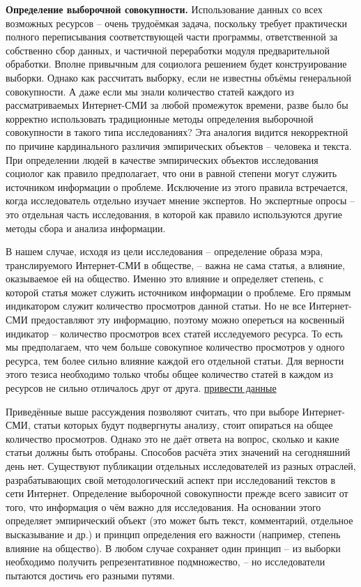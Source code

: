 \textbf{Определение выборочной совокупности.} Использование данных со всех возможных ресурсов -- очень трудоёмкая задача, поскольку требует практически полного переписывания соответствующей части программы, ответственной за собственно сбор данных, и частичной переработки модуля предварительной обработки. Вполне привычным для социолога решением будет конструирование выборки. Однако как рассчитать выборку, если не известны объёмы генеральной совокупности. А даже если мы знали количество статей каждого из рассматриваемых Интернет-СМИ за любой промежуток времени, разве было бы корректно использовать традиционные методы определения выборочной совокупности в такого типа исследованиях? Эта аналогия видится некорректной по причине кардинального различия эмпирических объектов -- человека и текста. При определении людей в качестве эмпирических объектов исследования социолог как правило предполагает, что они в равной степени могут служить источником информации о проблеме. Исключение из этого правила встречается, когда исследователь отдельно изучает мнение экспертов. Но экспертные опросы -- это отдельная часть исследования, в которой как правило используются другие методы сбора и анализа информации.

В нашем случае, исходя из цели исследования -- определение образа мэра, транслируемого Интернет-СМИ в обществе, -- важна не сама статья, а влияние, оказываемое ей на общество. Именно это влияние и определяет степень, с которой статья может служить источником информации о проблеме. Его прямым индикатором служит количество просмотров данной статьи. Но не все Интернет-СМИ предоставляют эту информацию, поэтому можно опереться на косвенный индикатор -- количество просмотров всех статей исследуемого ресурса. То есть мы предполагаем, что чем больше совокупное количество просмотров у одного ресурса, тем более сильно влияние каждой его отдельной статьи. Для верности этого тезиса необходимо только чтобы общее количество статей в каждом из ресурсов не сильно отличалось друг от друга. {\underline{привести данные}}

Приведённые выше рассуждения позволяют считать, что при выборе Интернет-СМИ, статьи которых будут подвергнуты анализу, стоит опираться на общее количество просмотров. Однако это не даёт ответа на вопрос, сколько и какие статьи должны быть отобраны. Способов расчёта этих значений на сегодняшний день нет. Существуют публикации отдельных исследователей из разных отраслей, разрабатывающих свой методологический аспект при исследований текстов в сети Интернет. Определение выборочной совокупности прежде всего зависит от того, что информация о чём важно для исследования. На основании этого определяет эмпирический объект (это может быть текст, комментарий, отдельное высказывание и др.) и принцип определения его важности (например, степень влияние на общество). В любом случае сохраняет один принцип -- из выборки необходимо получить репрезентативное подмножество, -- но исследователи пытаются достичь его разными путями.

